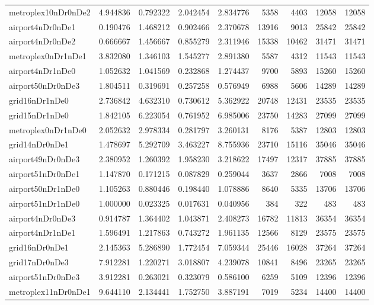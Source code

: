 \begin{longtable}{|l|r|r|r|r|r|r|r|r|}
metroplex10nDr0nDe2 & 4.944836 & 0.792322 & 2.042454 & 2.834776 & 5358 & 4403 & 12058 & 12058 \\
airport4nDr0nDe1 & 0.190476 & 1.468212 & 0.902466 & 2.370678 & 13916 & 9013 & 25842 & 25842 \\
airport4nDr0nDe2 & 0.666667 & 1.456667 & 0.855279 & 2.311946 & 15338 & 10462 & 31471 & 31471 \\
metroplex0nDr1nDe1 & 3.832080 & 1.346103 & 1.545277 & 2.891380 & 5587 & 4312 & 11543 & 11543 \\
airport4nDr1nDe0 & 1.052632 & 1.041569 & 0.232868 & 1.274437 & 9700 & 5893 & 15260 & 15260 \\
airport50nDr0nDe3 & 1.804511 & 0.319691 & 0.257258 & 0.576949 & 6988 & 5606 & 14289 & 14289 \\
grid16nDr1nDe0 & 2.736842 & 4.632310 & 0.730612 & 5.362922 & 20748 & 12431 & 23535 & 23535 \\
grid15nDr1nDe0 & 1.842105 & 6.223054 & 0.761952 & 6.985006 & 23750 & 14283 & 27099 & 27099 \\
metroplex0nDr1nDe0 & 2.052632 & 2.978334 & 0.281797 & 3.260131 & 8176 & 5387 & 12803 & 12803 \\
grid14nDr0nDe1 & 1.478697 & 5.292709 & 3.463227 & 8.755936 & 23710 & 15116 & 35046 & 35046 \\
airport49nDr0nDe3 & 2.380952 & 1.260392 & 1.958230 & 3.218622 & 17497 & 12317 & 37885 & 37885 \\
airport51nDr0nDe1 & 1.147870 & 0.171215 & 0.087829 & 0.259044 & 3637 & 2866 & 7008 & 7008 \\
airport50nDr1nDe0 & 1.105263 & 0.880446 & 0.198440 & 1.078886 & 8640 & 5335 & 13706 & 13706 \\
airport51nDr1nDe0 & 1.000000 & 0.023325 & 0.017631 & 0.040956 & 384 & 322 & 483 & 483 \\
airport4nDr0nDe3 & 0.914787 & 1.364402 & 1.043871 & 2.408273 & 16782 & 11813 & 36354 & 36354 \\
airport4nDr1nDe1 & 1.596491 & 1.217863 & 0.743272 & 1.961135 & 12566 & 8129 & 23575 & 23575 \\
grid16nDr0nDe1 & 2.145363 & 5.286890 & 1.772454 & 7.059344 & 25446 & 16028 & 37264 & 37264 \\
grid17nDr0nDe3 & 7.912281 & 1.220271 & 3.018807 & 4.239078 & 10841 & 8496 & 23265 & 23265 \\
airport51nDr0nDe3 & 3.912281 & 0.263021 & 0.323079 & 0.586100 & 6259 & 5109 & 12396 & 12396 \\
metroplex11nDr0nDe1 & 9.644110 & 2.134441 & 1.752750 & 3.887191 & 7019 & 5234 & 14400 & 14400 \\

\end{longtable}
